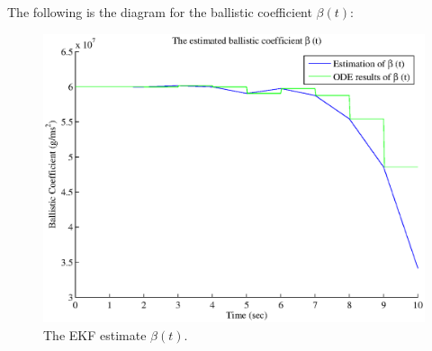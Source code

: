 \documentclass{article}
\begin{document}
\pagebreak 
The following is the diagram for the ballistic coefficient $\beta(t)$:
\begin{figure}[H]
\begin{center}
\includegraphics[width=\textwidth]{hw6_beta.eps}
\caption{ The EKF estimate $\beta(t)$.}
\end{center}
\end{figure} 
\end{document}
